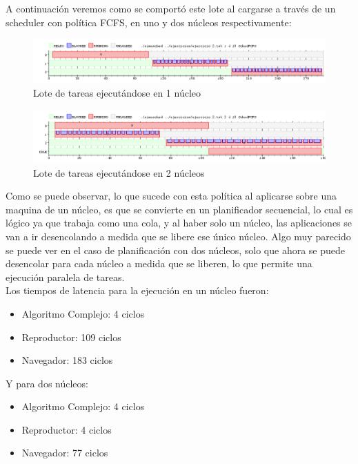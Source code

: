 \documentclass{article}
\begin{document}
A continuación veremos como se comportó este lote al cargarse a través de un scheduler con política FCFS, en uno y dos núcleos respectivamente:

\begin{figure}[h!]
\caption{Lote de tareas ejecutándose en 1 núcleo \label{grf:ex2-1}}
\centering
\includegraphics[width=15cm]{../ejercicios/ejercicio 2 - 1 nucleo}
\end{figure}

\begin{figure}[h!]
\caption{Lote de tareas ejecutándose en 2 núcleos \label{grf:ex2-2}}
\centering
\includegraphics[width=15cm]{../ejercicios/ejercicio 2 - 2 nucleos}
\end{figure}

Como se puede observar, lo que sucede con esta política al aplicarse sobre una maquina de un núcleo, es que se convierte en un planificador secuencial, lo cual es lógico ya que trabaja como una cola, y al haber solo un núcleo, las aplicaciones se van a ir desencolando a medida que se libere ese único núcleo.
Algo muy parecido se puede ver en el caso de planificación con dos núcleos, solo que ahora se puede desencolar para cada núcleo a medida que se liberen, lo que permite una ejecución paralela de tareas.\\
Los tiempos de latencia para la ejecución en un núcleo fueron:
\begin{itemize}
\item Algoritmo Complejo: 4 ciclos
\item Reproductor: 109 ciclos
\item Navegador: 183 ciclos
\end{itemize}

Y para dos núcleos:
\begin{itemize}
\item Algoritmo Complejo: 4 ciclos
\item Reproductor: 4 ciclos
\item Navegador: 77 ciclos
\end{itemize}
\end{document}
